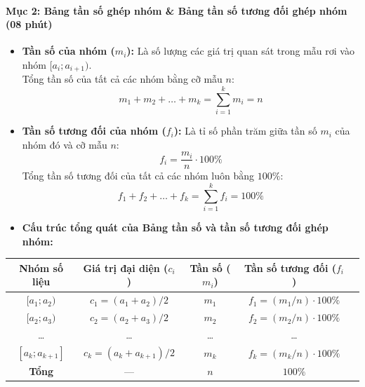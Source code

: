 \documentclass[12pt, a4paper]{article}
\begin{document}
\paragraph{Mục 2: Bảng tần số ghép nhóm \& Bảng tần số tương đối ghép nhóm (08 phút)}
\begin{itemize}
    \item \textbf{Tần số của nhóm ($m_i$):} Là số lượng các giá trị quan sát trong mẫu rơi vào nhóm $[a_i; a_{i+1})$.\\
    Tổng tần số của tất cả các nhóm bằng cỡ mẫu $n$:
    $$m_1 + m_2 + \dots + m_k = \sum_{i=1}^k m_i = n$$
    \item \textbf{Tần số tương đối của nhóm ($f_i$):} Là tỉ số phần trăm giữa tần số $m_i$ của nhóm đó và cỡ mẫu $n$:
    $$f_i = \dfrac{m_i}{n} \cdot 100\%$$
    Tổng tần số tương đối của tất cả các nhóm luôn bằng $100\%$:
    $$f_1 + f_2 + \dots + f_k = \sum_{i=1}^k f_i = 100\%$$
    \item \textbf{Cấu trúc tổng quát của Bảng tần số và tần số tương đối ghép nhóm:}
\end{itemize}

\begin{center}
\begin{tabularx}{0.95\linewidth}{|c|c|c|c|c|}
\hline
\textbf{Nhóm số liệu} & \textbf{Giá trị đại diện ($c_i$)} & \textbf{Tần số ($m_i$)} & \textbf{Tần số tương đối ($f_i$)} \\
\hline
$[a_1; a_2)$ & $c_1 = (a_1 + a_2)/2$ & $m_1$ & $f_1 = (m_1/n) \cdot 100\%$ \\
$[a_2; a_3)$ & $c_2 = (a_2 + a_3)/2$ & $m_2$ & $f_2 = (m_2/n) \cdot 100\%$ \\
\dots & \dots & \dots & \dots \\
$[a_k; a_{k+1}]$ & $c_k = (a_k + a_{k+1})/2$ & $m_k$ & $f_k = (m_k/n) \cdot 100\%$ \\
\hline
\textbf{Tổng} & --- & $n$ & $100\%$ \\
\hline
\end{tabularx}
\end{center}
\end{document}
